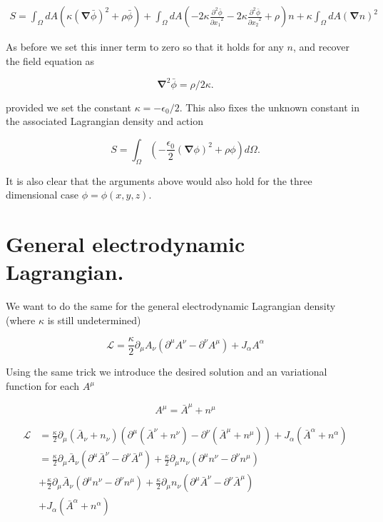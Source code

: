 \documentclass{article}
\newcommand{\LL}[0]{\mathcal{L}}
\newcommand{\spacegrad}[0]{\boldsymbol{\nabla}}
\newcommand{\PDd}[2]{\frac{\partial^2 {#2}}{{\partial{#1}}^2}}
\newcommand{\barA}[0]{\bar{A}}
\begin{document}
\begin{align*}
S = \int_{\Omega} dA \left( \kappa {(\spacegrad \bar{\phi})}^2 + \rho \bar{\phi} \right)
  + \int_{\Omega} dA \left( -2 \kappa \PDd{x_1}{\bar{\phi}} -2 \kappa \PDd{x_2}{\bar{\phi}} + \rho \right) n
  + \kappa \int_{\Omega} dA {(\spacegrad n)}^2
\end{align*}

As before we set this inner term to zero so that it holds for any $n$, and recover the field equation as

\begin{equation*}
\spacegrad^2 \bar{\phi} = \rho/2 \kappa.
\end{equation*}

provided we set the constant $\kappa = -\epsilon_0/2$.  This also fixes the unknown constant in the associated Lagrangian density and action

\begin{equation}
S = \int_{\Omega} \left(- \frac{\epsilon_0}{2} (\spacegrad \phi)^2 + \rho \phi \right) d\Omega.
\end{equation}

It is also clear that the arguments above would also hold for the three dimensional case $\phi = \phi(x, y, z)$.

\section{ General electrodynamic Lagrangian. }

We want to do the same for the general electrodynamic Lagrangian density (where $\kappa$ is still undetermined)

\begin{equation}
\LL = \frac{\kappa}{2} \partial_{\mu} A_{\nu} ( \partial^{\mu} A^{\nu} - \partial^{\nu} A^{\mu} ) + J_{\alpha} A^{\alpha}
\end{equation}


Using the same trick we introduce the desired solution and an variational function for each $A^{\mu}$

\begin{equation*}
A^{\mu} = \barA^{\mu} + n^{\mu}
\end{equation*}

\begin{align*}
\LL 
&= \frac{\kappa}{2} \partial_{\mu} (\barA_{\nu} + n_{\nu}) ( \partial^{\mu} (\barA^{\nu} + n^{\nu}) - \partial^{\nu} (\barA^{\mu} + n^{\mu}) ) + J_{\alpha} (\barA^{\alpha} + n^{\alpha}) \\
&= \frac{\kappa}{2} \partial_{\mu} \barA_{\nu} ( \partial^{\mu} \barA^{\nu} - \partial^{\nu} \barA^{\mu} ) + \frac{\kappa}{2} \partial_{\mu} n_{\nu} ( \partial^{\mu} n^{\nu} - \partial^{\nu} n^{\mu} )  \\
&+ \frac{\kappa}{2} \partial_{\mu} \barA_{\nu} ( \partial^{\mu} n^{\nu} - \partial^{\nu} n^{\mu} ) + \frac{\kappa}{2} \partial_{\mu} n_{\nu} ( \partial^{\mu} \barA^{\nu} - \partial^{\nu} \barA^{\mu} )  \\
&+ J_{\alpha} (\barA^{\alpha} + n^{\alpha}) \\
\end{align*}
\end{document}
